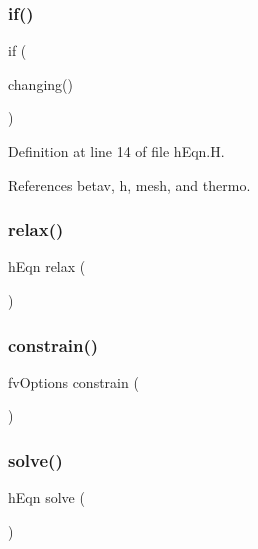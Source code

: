 \subsubsection{\texorpdfstring{if()}{if()}}
{\footnotesize\ttfamily if (\begin{DoxyParamCaption}\item[{mesh.}]{changing() }\end{DoxyParamCaption})}



Definition at line 14 of file h\+Eqn.\+H.



References betav, h, mesh, and thermo.

\mbox{\label{hEqn_8H_ae9cae8cc742ef3065937bfd98e08d6bd}} 
\subsubsection{\texorpdfstring{relax()}{relax()}}
{\footnotesize\ttfamily h\+Eqn relax (\begin{DoxyParamCaption}{ }\end{DoxyParamCaption})}

\mbox{\label{hEqn_8H_a690291494cdd58cd590191bf0cfae129}} 
\subsubsection{\texorpdfstring{constrain()}{constrain()}}
{\footnotesize\ttfamily fv\+Options constrain (\begin{DoxyParamCaption}\item[{h\+Eqn}]{ }\end{DoxyParamCaption})}

\mbox{\label{hEqn_8H_ac393846f32fcfca6facb8d23d493a8c5}} 
\subsubsection{\texorpdfstring{solve()}{solve()}}
{\footnotesize\ttfamily h\+Eqn solve (\begin{DoxyParamCaption}{ }\end{DoxyParamCaption})}


